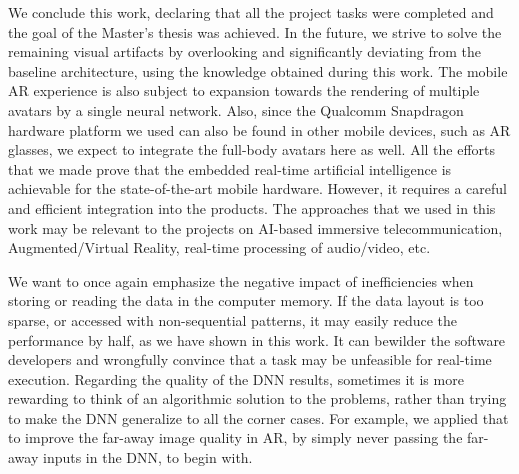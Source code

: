 We conclude this work, declaring that all the project tasks were completed and the goal of the Master's thesis was achieved. In the future, we strive to solve the remaining visual artifacts by overlooking and significantly deviating from the baseline architecture, using the knowledge obtained during this work. The mobile AR experience is also subject to expansion towards the rendering of multiple avatars by a single neural network. Also, since the Qualcomm Snapdragon hardware platform we used can also be found in other mobile devices, such as AR glasses, we expect to integrate the full-body avatars here as well. All the efforts that we made prove that the embedded real-time artificial intelligence is achievable for the state-of-the-art mobile hardware. However, it requires a careful and efficient integration into the products. The approaches that we used in this work may be relevant to the projects on AI-based immersive telecommunication, Augmented/Virtual Reality, real-time processing of audio/video, etc. 

We want to once again emphasize the negative impact of inefficiencies when storing or reading the data in the computer memory. If the data layout is too sparse, or accessed with non-sequential patterns, it may easily reduce the performance by half, as we have shown in this work. It can bewilder the software developers and wrongfully convince that a task may be unfeasible for real-time execution.  Regarding the quality of the DNN results, sometimes it is more rewarding to think of an algorithmic solution to the problems, rather than trying to make the DNN generalize to all the corner cases. For example, we applied that to improve the far-away image quality in AR, by simply never passing the far-away inputs in the DNN, to begin with.

